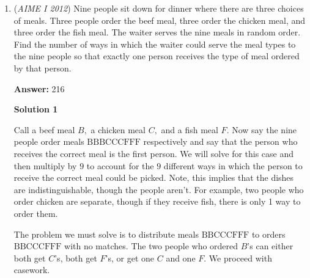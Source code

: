 \begin{enumerate}
 



\textbf{Solution 4 (Similar to the above solutions)}

Let the sequence be $a,a+d,a+2d,..., a+(k-1)d$. Since there are $k$ terms, we have an equation $k^2 = 836-715 = 121$. Solving, we get $k$ as $11$. Replacing $k$ in our sequence with $11$, we get $a,a+d,a+2d,..., a+10d$. The sum of this sequence is equal to $715$, or $\frac{(2a+10d)(11)}{2} = 715$, and by simplifying we get $a+5d=65$. We are asked for the first, middle, and end terms, which are $a$,$a+5d$, and $a+10d$ respectively. Their sum is $3a+15$, or $3 \cdot (a+5d)$. Our desired answer is $65 \cdot 3 = \boxed{195}$.

 \href{https://artofproblemsolving.com/videos/amc/2012aimei/298}{https://artofproblemsolving.com/videos/amc/2012aimei/298}

 


	\item (\textit{AIME I 2012}) Nine people sit down for dinner where there are three choices of meals. Three people order the beef meal, three order the chicken meal, and three order the fish meal. The waiter serves the nine meals in random order. Find the number of ways in which the waiter could serve the meal types to the nine people so that exactly one person receives the type of meal ordered by that person.


 
 \textbf{Answer: }216



\textbf{Solution 1}

Call a beef meal $B,$ a chicken meal $C,$ and a fish meal $F.$ Now say the nine people order meals $\text{BBBCCCFFF}$ respectively and say that the person who receives the correct meal is the first person. We will solve for this case and then multiply by $9$ to account for the $9$ different ways in which the person to receive the correct meal could be picked. Note, this implies that the dishes are indistinguishable, though the people aren't. For example, two people who order chicken are separate, though if they receive fish, there is only 1 way to order them.

 The problem we must solve is to distribute meals $\text{BBCCCFFF}$ to orders $\text{BBCCCFFF}$ with no matches. The two people who ordered $B$'s can either both get $C$'s, both get $F$'s, or get one $C$ and one $F.$ We proceed with casework.


\end{enumerate}
